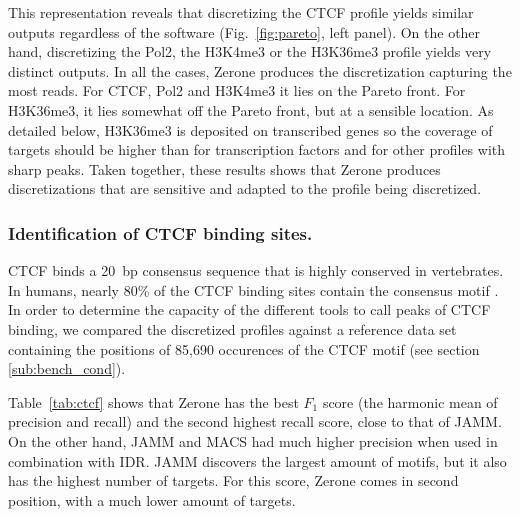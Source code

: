 \documentclass{bioinfo}
\begin{document}
This representation reveals that discretizing the CTCF profile yields
similar outputs regardless of the software (Fig.~\ref{fig:pareto},
left panel). On the other hand, discretizing the Pol2, the H3K4me3 or
the H3K36me3 profile yields very distinct outputs. In
all the cases, Zerone produces the discretization capturing the most
reads. For CTCF, Pol2 and H3K4me3 it lies on the Pareto front. For
H3K36me3, it lies somewhat off the Pareto front, but at a sensible
location. As detailed below, H3K36me3 is deposited on transcribed
genes \citep{pmid16122420,pmid23739122} so the coverage of targets
should be higher than for transcription factors and for other profiles
with sharp peaks. Taken together, these results shows that Zerone
produces discretizations that are sensitive and adapted to the
profile being discretized.

\subsubsection{Identification of CTCF binding sites.}
CTCF binds a 20~bp consensus sequence that is highly conserved in
vertebrates. In humans, nearly 80\% of the CTCF binding sites contain
the consensus motif \citep{pmid17382889}. In order to determine the
capacity of the different tools to call peaks of CTCF binding, we
compared the discretized profiles against a reference data set
containing the positions of 85,690 occurences of the CTCF motif
(see section \ref{sub:bench_cond}).

Table~\ref{tab:ctcf} shows that Zerone has the best $F_1$ score (the
harmonic mean of precision and recall) and the second highest recall
score, close to that of JAMM. On the other hand, JAMM and MACS had
much higher precision when used in combination with IDR. JAMM discovers
the largest amount of motifs, but it also has the highest number
of targets. For this score, Zerone comes in second position, with a
much lower amount of targets.
\end{document}
